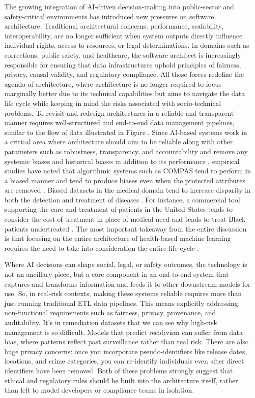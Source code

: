 The growing integration of AI-driven decision-making into public-sector and safety-critical environments has introduced new pressures on software architecture. Traditional architectural concerns, performance, scalability, interoperability, are no longer sufficient when system outputs directly influence individual rights, access to resources, or legal determinations. In domains such as corrections, public safety, and healthcare, the software architect is increasingly responsible for ensuring that data infrastructures uphold principles of fairness, privacy, causal validity, and regulatory compliance. All these forces redefine the agenda of architecture, where architecture is no longer required to focus marginally better due to its technical capabilities but aims to navigate the data life cycle while keeping in mind the risks associated with socio-technical problems. To revisit and redesign architectures in a reliable and transparent manner requires well-structured and end-to-end data management pipelines, similar to the flow of data illustrated in Figure . Since AI-based systems work in a critical area where architecture should aim to be reliable along with other parameters such as robustness, transparency, and accountability and remove any systemic biases and historical biases in addition to its performance  , empirical studies have noted that algorithmic systems such as COMPAS tend to perform in a biased manner and tend to produce biases even when the protected attributes are removed  . Biased datasets in the medical domain tend to increase disparity in both the detection and treatment of diseases  . For instance, a commercial tool supporting the care and treatment of patients in the United States tends to consider the cost of treatment in place of medical need and tends to treat Black patients undertreated  . The most important takeaway from the entire discussion is that focusing on the entire architecture of health-based machine learning requires the need to take into consideration the entire life cycle  .

Where AI decisions can shape social, legal, or safety outcomes, the technology is not an ancillary piece, but a core component in an end-to-end system that captures and transforms information and feeds it to other downstream models for use. So, in real-risk contexts, making these systems reliable requires more than just running traditional ETL data pipelines. This means explicitly addressing non-functional requirements such as fairness, privacy, provenance, and auditability. It’s in remediation datasets that we can see why high-risk management is so difficult. Models that predict recidivism can suffer from data bias, where patterns reflect past surveillance rather than real risk. There are also huge privacy concerns: once you incorporate pseudo-identifiers like release dates, locations, and crime categories, you can re-identify individuals even after direct identifiers have been removed. Both of these problems strongly suggest that ethical and regulatory rules should be built into the architecture itself, rather than left to model developers or compliance teams in isolation.


